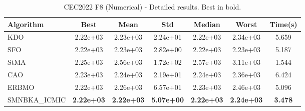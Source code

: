 \begin{table}[H]
\centering\small
\caption{CEC2022 F8 (Numerical) - Detailed results. Best in bold.}
\label{tab:cec2022_F8}
\begin{tabular}{lcccccc}
\toprule
\textbf{Algorithm} & \textbf{Best} & \textbf{Mean} & \textbf{Std} & \textbf{Median} & \textbf{Worst} & \textbf{Time(s)} \\
\midrule
KDO & 2.22e+03 & 2.23e+03 & 2.24e+01 & 2.22e+03 & 2.34e+03 & 5.659 \\
SFO & 2.22e+03 & 2.23e+03 & 2.82e+00 & 2.22e+03 & 2.23e+03 & 5.187 \\
StMA & 2.25e+03 & 2.56e+03 & 1.72e+02 & 2.57e+03 & 3.11e+03 & 1.544 \\
CAO & 2.23e+03 & 2.24e+03 & 2.19e+01 & 2.24e+03 & 2.36e+03 & 6.424 \\
ERBMO & 2.22e+03 & 2.26e+03 & 6.57e+01 & 2.23e+03 & 2.46e+03 & 5.096 \\
SMNBKA_ICMIC & \textbf{2.22e+03} & \textbf{2.22e+03} & \textbf{5.07e+00} & \textbf{2.22e+03} & \textbf{2.24e+03} & \textbf{3.478} \\
\bottomrule
\end{tabular}
\end{table}
